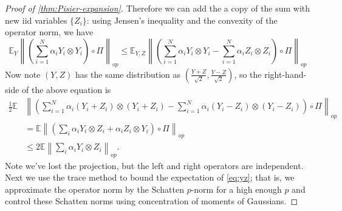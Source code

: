 \documentclass[aos]{imsart}
\theoremstyle{definition}
\DeclareMathOperator{\mat}{Mat}
\DeclareMathOperator{\tr}{Tr}
\newcommand{\ot}{\otimes}
\newcommand{\E}{\mathbb{E}}
\newcommand{\CF}[1]{{\color{purple}[CF: #1]}}
\begin{document}
\begin{appendix}
\begin{proof} [Proof of \cref{thm:Pisier-expansion}]
Therefore we can add the a copy of the sum with new iid variables $\{Z_{i}\}$: using Jensen's inequality and the convexity of the operator norm, we have
\[ \E_{Y} \left\|\left(\sum_{i=1}^{N} \alpha_{i} Y_{i} \otimes Y_{i}\right) \circ \Pi\right\|_{op} \leq
\E_{Y,Z} \left\|\left(\sum_{i=1}^{N} \alpha_{i} Y_{i} \otimes Y_{i}-\sum_{i=1}^{N} \alpha_{i} Z_{i} \otimes Z_{i}\right) \circ \Pi \right\|_{op}  \] Now note $(Y,Z)$ has the same distribution as $(\frac{Y+Z}{\sqrt{2}},\frac{Y-Z}{\sqrt{2}})$, so the right-hand-side of the above equation is
\begin{align}\frac{1}{2}\E &\left\|\left(\sum_{i=1}^{N} \alpha_{i} (Y_{i}+Z_{i}) \otimes (Y_{i}+Z_{i})  - \sum_{i=1}^{N} \alpha_{i} (Y_{i}-Z_{i}) \otimes (Y_{i}-Z_{i})\right)\circ \Pi \right\|_{op}\nonumber \\
& = \E \left\|\left(\sum_{i} \alpha_{i} Y_{i} \otimes Z_{i}  + \alpha_{i} Z_{i} \otimes Y_{i} \right) \circ \Pi \right\|_{op}  \nonumber\\
& \leq 2 \E \left\|\sum_{i} \alpha_{i} Y_{i} \otimes Z_{i}\right\|_{op}.   \label{eq:yz}
\end{align}
Note we've lost the projection, but the left and right operators are independent. Next we use the trace method to bound the expectation of \cref{eq:yz}; that is, we approximate the operator norm by the Schatten $p$-norm for a high enough $p$ and control these Schatten norms using concentration of moments of Gaussians.


\end{proof}
\end{appendix}
\end{document}
